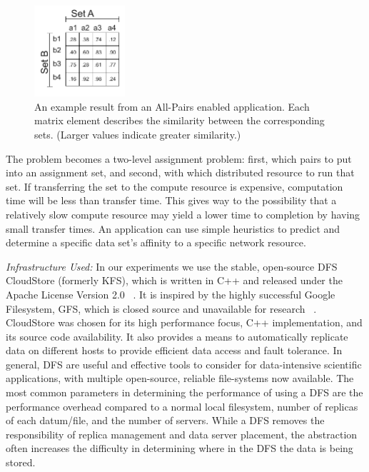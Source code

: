 \documentclass{rspublic}
\begin{document}
\begin{figure}[!ht]
 \begin{center}
     \includegraphics[width=0.3\textwidth]{data/allpairs-exp.pdf}
\end{center}
\caption{\small An example result from an All-Pairs enabled application.
Each matrix element describes the similarity between the corresponding
sets. (Larger values indicate greater similarity.)}
 \label{Fig:AllPairsExplanation}
\end{figure}

The problem becomes a two-level assignment problem: first, which pairs
to put into an assignment set, and second, with which distributed
resource to run that set. If transferring the set to the compute
resource is expensive, computation time will be less than transfer time.
This gives way to the possibility that a relatively slow compute
resource may yield a lower time to completion by having small transfer
times. An application can use simple heuristics to predict and
determine a specific data set's affinity to a specific network resource.


{\it Infrastructure Used: } In our experiments we use the stable,
open-source DFS CloudStore (formerly KFS), which is written in C++ and
released under the Apache License Version 2.0 ~\citep{cloudstore_web}.
It is inspired by the highly successful Google Filesystem, GFS, which is
closed source and unavailable for research ~\citep{GFS}. CloudStore was
chosen for its high performance focus, C++ implementation, and its
source code availability. It also provides a means to automatically
replicate data on different hosts to provide efficient data access and
fault tolerance. In general, DFS are useful and effective tools to
consider for data-intensive scientific applications, with multiple
open-source, reliable file-systems now available. The most common
parameters in determining the performance of using a DFS are the
performance overhead compared to a normal local filesystem, number of
replicas of each datum/file, and the number of servers. While a DFS
removes the responsibility of replica management and data server
placement, the abstraction often increases the difficulty in determining
where in the DFS the data is being stored.
\end{document}
